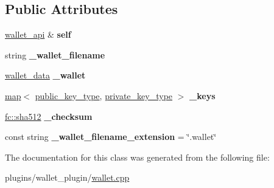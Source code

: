 \subsection*{Public Attributes}
\begin{DoxyCompactItemize}
\item 
\mbox{\label{classaacio_1_1wallet_1_1detail_1_1wallet__api__impl_a94ea26963734f8940a1560ec1fd048fc}} 
\mbox{\hyperlink{classaacio_1_1wallet_1_1wallet__api}{wallet\+\_\+api}} \& {\bfseries self}
\item 
\mbox{\label{classaacio_1_1wallet_1_1detail_1_1wallet__api__impl_ada1d4a44ee8406cf360621ae23eb87f1}} 
string {\bfseries \+\_\+wallet\+\_\+filename}
\item 
\mbox{\label{classaacio_1_1wallet_1_1detail_1_1wallet__api__impl_ac831d5c98cf6a9f64f536b07ddeed264}} 
\mbox{\hyperlink{structaacio_1_1wallet_1_1wallet__data}{wallet\+\_\+data}} {\bfseries \+\_\+wallet}
\item 
\mbox{\label{classaacio_1_1wallet_1_1detail_1_1wallet__api__impl_a6fc339ca738fcbd1ed53141300ea344e}} 
\mbox{\hyperlink{classstd_1_1map}{map}}$<$ \mbox{\hyperlink{classfc_1_1crypto_1_1public__key}{public\+\_\+key\+\_\+type}}, \mbox{\hyperlink{classfc_1_1crypto_1_1private__key}{private\+\_\+key\+\_\+type}} $>$ {\bfseries \+\_\+keys}
\item 
\mbox{\label{classaacio_1_1wallet_1_1detail_1_1wallet__api__impl_a1c1adba13ee18191fce65b6412b0f6f7}} 
\mbox{\hyperlink{classfc_1_1sha512}{fc\+::sha512}} {\bfseries \+\_\+checksum}
\item 
\mbox{\label{classaacio_1_1wallet_1_1detail_1_1wallet__api__impl_afdfc6f74ac02f44a7fd40dedecb45410}} 
const string {\bfseries \+\_\+wallet\+\_\+filename\+\_\+extension} = \char`\"{}.wallet\char`\"{}
\end{DoxyCompactItemize}


The documentation for this class was generated from the following file\+:\begin{DoxyCompactItemize}
\item 
plugins/wallet\+\_\+plugin/\mbox{\hyperlink{wallet_8cpp}{wallet.\+cpp}}\end{DoxyCompactItemize}
